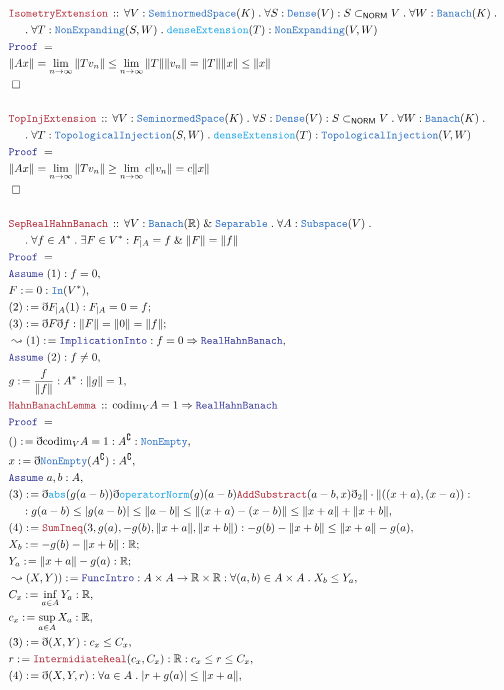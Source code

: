 \documentclass[12pt]{scrartcl}
\newcommand{\TYPE}[1]{\textcolor{NavyBlue}{\mathtt{#1}}}
\newcommand{\FUNC}[1]{\textcolor{Cerulean}{\mathtt{#1}}}
\newcommand{\LOGIC}[1]{\textcolor{Blue}{\mathtt{#1}}}
\newcommand{\THM}[1]{\textcolor{Maroon}{\mathtt{#1}}}
\renewcommand{\.}{\; . \;}
\newcommand{\de}{: \kern 0.1pc =}
\newcommand{\Theorem}[2]{& \THM{#1} \, :: \, #2 \\ & \Proof = \\ }
\newcommand{\NewLine}{\\ & \kern 1pc}
\newcommand{\Page}[1]{\begin{align*} #1 \end{align*} \newpage   }
\newcommand{ \bd }{ \ByDef }
\renewcommand{\And}{\; \& \;}
\newcommand{\Reals}{\mathbb{R} }
\renewcommand{\c}{\complement}
\newcommand{\Say}[3]{& #1 \de #2 : #3, \\}
\newcommand{\Conclude}[3]{& #1 \de #2 : #3; \\}
\newcommand{\Derive}[3]{& \leadsto #1 \de #2 : #3, \\}
\newcommand{\A}{\LOGIC{Assume} \;}
\newcommand{\Assume}[2]{& \A #1 : #2, \\}
\newcommand{\QED}{\; \square}
\newcommand{\EndProof}{& \QED \\}
\newcommand{\ByDef}{\eth}
\newcommand{\Proof}{\LOGIC{Proof} \; }
\newcommand{\Dense}{\TYPE{Dense}}
\newcommand{\SNS}{\TYPE{SeminormedSpace}}
\newcommand{\Banach}{\TYPE{Banach}}
\newcommand{\NORM}{\textsf{NORM}}
\begin{document}
\Page{
\\
\Theorem{IsometryExtension}{ \forall V : \SNS(K) \. \forall S : \Dense(V) : S \subset_\NORM V \. \forall W : \Banach(K) \. \NewLine
\.
\forall T : \TYPE{NonExpanding}(S,W) \. \FUNC{denseExtension}(T) : \TYPE{NonExpanding}(V,W) }
&
 \| A x  \| = \lim_{n \to \infty} \| T v_n \| \le  \lim_{n \to \infty} \| T  \| \| v_n \|
 = \| T \| \| x \| \le \| x \|  
 \\
 \EndProof
 \\
 \Theorem{TopInjExtension}{ \forall V : \SNS(K) \. \forall S : \Dense(V) : S \subset_\NORM V \. \forall W : \Banach(K) \. \NewLine
\.
\forall T : \TYPE{TopologicalInjection}(S,W) \. \FUNC{denseExtension}(T) : \TYPE{TopologicalInjection}(V,W) }
&
 \| A x  \| = \lim_{n \to \infty} \| T v_n \| \ge  \lim_{n \to \infty} c \| v_n \|
 =  c \| x \|  
 \\
 \EndProof
 \\
 \Theorem{SepRealHahnBanach}
    {\forall V : \Banach(\Reals) \And \TYPE{Separable} \. \forall A : \TYPE{Subspace}(V) \.
     \NewLine           \.     
     \forall f \in A^*  \. \exists F \in V^* :  F_{|A} = f \And \| F \| = \| f \|    
     }
    \Assume{(1)}{f = 0}
    \Say{F}{0}{\TYPE{In}(V^*)}
    \Conclude{(2)}{ \bd F_{|A} (1) }{ F_{|A} = 0 = f }
    \Conclude{(3)}{ \bd F \bd f }{ \| F \| = \| 0 \| = \| f \| }
    \Derive{(1)}{ \LOGIC{ImplicationInto} }{ f = 0 \Rightarrow \LOGIC{RealHahnBanach}}
    \Assume{(2)}{ f \neq 0}
    \Say{g}{\frac{f}{\| f \|}}{ A^* : \|g\| = 1}
    \Theorem{HahnBanachLemma}{ \mathrm{codim}_V  A = 1 \Rightarrow  
     \LOGIC{RealHahnBanach} }
    \Say{()}{ \bd \mathrm{codim}_V  A =  1}{A^\c : \TYPE{NonEmpty}}
    \Say{x}{ \bd \TYPE{NonEmpty}(A^\c) }{A^\c}
    \Assume{a,b}{A}
    \Say{(3)}{ \bd \FUNC{abs}(g(a - b))\bd \FUNC{operatorNorm}(g)(a-b)\THM{AddSubstract}(a-b,x)
          \bd_2 \| \cdot \|((x + a), (x - a))     
      }{ \NewLine : g(a - b) \le |g(a - b)| \le  \| a - b \| \le \| (x + a) - (x -b) \| 
        \le  \| x + a  \| + \| x + b \| 
    }
   \Say{(4)}{\THM{SumIneq}(3,g(a), -g(b), \|x + a \|, \|x + b \|   )}{ -g(b) - \|x + b \| \le 
   \| x + a \| - g(a)}
   \Conclude{X_b}{ -g(b) - \|x + b \|   }{ \Reals }
   \Conclude{Y_a}{ \|x + a \| - g(a)}{\Reals}
   \Derive{(X,Y))}{\LOGIC{FuncIntro}}{A \times A \to \Reals \times \Reals : 
   \forall (a,b) \in A \times A \. X_b \le Y_a}
   \Say{C_x}{ \inf_{a \in A} Y_a}{\Reals}
   \Say{c_x}{ \sup_{a \in A} X_a}{\Reals}
   \Say{(3)}{ \bd(X,Y)}{c_x \le C_x}
   \Say{r}{ \THM{IntermidiateReal}(c_x,C_x)}{\Reals : c_x \le r \le C_x }
   \Say{(4)}{ \bd (X,Y,r)}{\forall a \in A \. |r + g(a)| \le \| x + a \|}
      }
\end{document}
